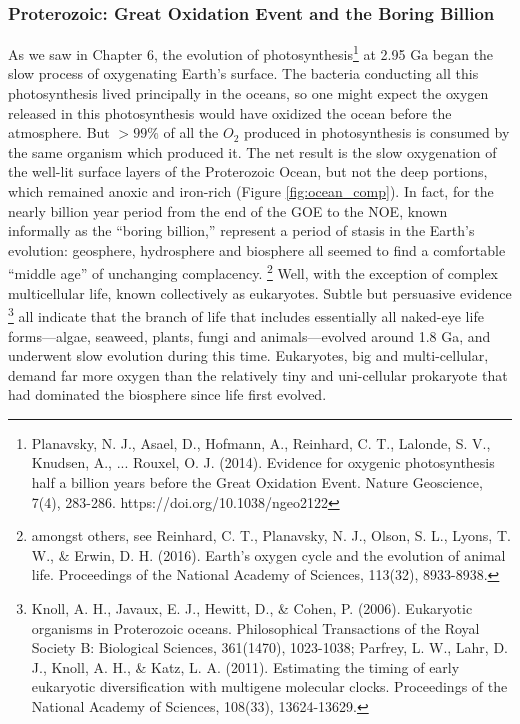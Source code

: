 {\subsubsection{Proterozoic: Great Oxidation Event and the Boring Billion}
As we saw in Chapter 6, the evolution of photosynthesis\footnote{Planavsky, N. J., Asael, D., Hofmann, A., Reinhard, C. T., Lalonde, S. V., Knudsen, A., ... Rouxel, O. J. (2014). Evidence for oxygenic photosynthesis half a billion years before the Great Oxidation Event. Nature Geoscience, 7(4), 283-286. https://doi.org/10.1038/ngeo2122} at 2.95 Ga began the slow process of oxygenating Earth's surface. The bacteria conducting all this photosynthesis lived principally in the oceans, so one might expect the oxygen released in this photosynthesis would have oxidized the ocean before the atmosphere. But $>99\%$ of all the $O_2$ produced in photosynthesis is consumed by the same organism which produced it. The net result is the slow oxygenation of the well-lit surface layers of the Proterozoic Ocean, but not the deep portions, which remained anoxic and iron-rich (Figure \ref{fig:ocean_comp}). In fact, for the nearly billion year period from the end of the GOE to the NOE, known informally as the ``boring billion,'' represent a period of stasis in the Earth's evolution: geosphere, hydrosphere and biosphere all seemed to find a comfortable ``middle age'' of unchanging complacency. \footnote{amongst others, see Reinhard, C. T., Planavsky, N. J., Olson, S. L., Lyons, T. W., \& Erwin, D. H. (2016). Earth's oxygen cycle and the evolution of animal life. Proceedings of the National Academy of Sciences, 113(32), 8933-8938.} Well, with the exception of complex multicellular life, known collectively as eukaryotes. Subtle but persuasive evidence \footnote{Knoll, A. H., Javaux, E. J., Hewitt, D., \& Cohen, P. (2006). Eukaryotic organisms in Proterozoic oceans. Philosophical Transactions of the Royal Society B: Biological Sciences, 361(1470), 1023-1038; Parfrey, L. W., Lahr, D. J., Knoll, A. H., \& Katz, L. A. (2011). Estimating the timing of early eukaryotic diversification with multigene molecular clocks. Proceedings of the National Academy of Sciences, 108(33), 13624-13629.} all indicate that the branch of life that includes essentially all naked-eye life forms---algae, seaweed, plants, fungi and animals---evolved around 1.8 Ga, and underwent slow evolution during this time. Eukaryotes, big and multi-cellular, demand far more oxygen than the relatively tiny and uni-cellular prokaryote that had dominated the biosphere since life first evolved.    
}
